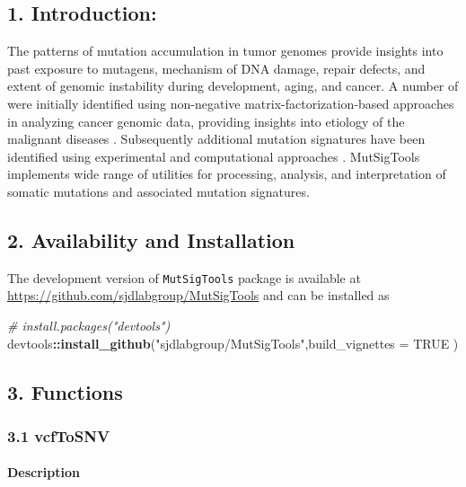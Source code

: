 \documentclass[]{article}
\newenvironment{Shaded}{\begin{snugshade}}{\end{snugshade}}
\newcommand{\KeywordTok}[1]{\textcolor[rgb]{0.13,0.29,0.53}{\textbf{#1}}}
\newcommand{\DataTypeTok}[1]{\textcolor[rgb]{0.13,0.29,0.53}{#1}}
\newcommand{\StringTok}[1]{\textcolor[rgb]{0.31,0.60,0.02}{#1}}
\newcommand{\CommentTok}[1]{\textcolor[rgb]{0.56,0.35,0.01}{\textit{#1}}}
\newcommand{\OtherTok}[1]{\textcolor[rgb]{0.56,0.35,0.01}{#1}}
\newcommand{\OperatorTok}[1]{\textcolor[rgb]{0.81,0.36,0.00}{\textbf{#1}}}
\newcommand{\NormalTok}[1]{#1}
\let\oldparagraph\paragraph
\renewcommand{\paragraph}[1]{\oldparagraph{#1}\mbox{}}
\begin{document}
\subsection{1. Introduction:}\label{introduction}

The patterns of mutation accumulation in tumor genomes provide insights
into past exposure to mutagens, mechanism of DNA damage, repair defects,
and extent of genomic instability during development, aging, and cancer.
A number of  were initially identified using
non-negative matrix-factorization-based approaches in analyzing cancer
genomic data, providing insights into etiology of the malignant diseases
\citet{alexandrov2013signatures}. Subsequently additional mutation
signatures have been identified using experimental and computational
approaches \citet{liu2017mutational}. MutSigTools implements wide range
of utilities for processing, analysis, and interpretation of somatic
mutations and associated mutation signatures.

\subsection{2. Availability and
Installation}\label{availability-and-installation}

The development version of \texttt{MutSigTools} package is available at
\url{https://github.com/sjdlabgroup/MutSigTools} and can be installed as

\begin{Shaded}
\begin{Highlighting}[]
\CommentTok{# install.packages("devtools")}
\NormalTok{devtools}\OperatorTok{::}\KeywordTok{install_github}\NormalTok{(}\StringTok{"sjdlabgroup/MutSigTools"}\NormalTok{,}\DataTypeTok{build_vignettes =} \OtherTok{TRUE}\NormalTok{ )}
\end{Highlighting}
\end{Shaded}

\subsection{3. Functions}\label{functions}

\hypertarget{vcfToSNV}{\subsubsection{3.1 vcfToSNV}\label{vcfToSNV}}

\paragraph{\texorpdfstring{\textbf{Description}}{Description}}\label{description}
\end{document}
